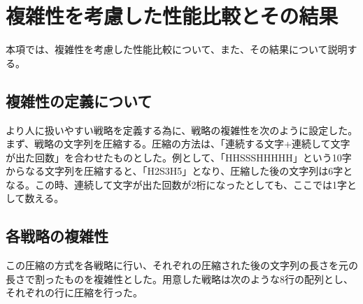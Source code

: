 \section{複雑性を考慮した性能比較とその結果}

本項では、複雑性を考慮した性能比較について、また、その結果について説明する。

\subsection{複雑性の定義について}

より人に扱いやすい戦略を定義する為に、戦略の複雑性を次のように設定した。
まず、戦略の文字列を圧縮する。圧縮の方法は、「連続する文字+連続して文字が出た回数」を合わせたものとした。例として、「HHSSSHHHHH」という10字からなる文字列を圧縮すると、「H2S3H5」となり、圧縮した後の文字列は6字となる。この時、連続して文字が出た回数が2桁になったとしても、ここでは1字として数える。

\subsection{各戦略の複雑性}

この圧縮の方式を各戦略に行い、それぞれの圧縮された後の文字列の長さを元の長さで割ったものを複雑性とした。用意した戦略は次のような8行の配列とし、それぞれの行に圧縮を行った。\\


